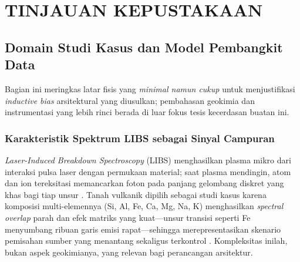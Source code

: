 
\chapter{TINJAUAN KEPUSTAKAAN}

\section{Domain Studi Kasus dan Model Pembangkit Data}

Bagian ini meringkas latar fisis yang \emph{minimal namun cukup} untuk menjustifikasi \textit{inductive bias} arsitektural yang diusulkan; pembahasan geokimia dan instrumentasi yang lebih rinci berada di luar fokus tesis kecerdasan buatan ini.

\subsection{Karakteristik Spektrum LIBS sebagai Sinyal Campuran}
\textit{Laser-Induced Breakdown Spectroscopy} (LIBS) menghasilkan plasma mikro dari interaksi pulsa laser dengan permukaan material; saat plasma mendingin, atom dan ion tereksitasi memancarkan foton pada panjang gelombang diskret yang khas bagi tiap unsur \citep{legnaioli_laser-induced_2025, sawyers_database_2025}. Tanah vulkanik dipilih sebagai studi kasus karena komposisi multi-elemennya (Si, Al, Fe, Ca, Mg, Na, K) menghasilkan \textit{spectral overlap} parah dan efek matriks yang kuat---unsur transisi seperti Fe menyumbang ribuan garis emisi rapat---sehingga merepresentasikan skenario pemisahan sumber yang menantang sekaligus terkontrol \citep{harmon_laser-induced_2019, fabre_advances_2020, manelski_libs_2024}. Kompleksitas inilah, bukan aspek geokimianya, yang relevan bagi perancangan arsitektur.

